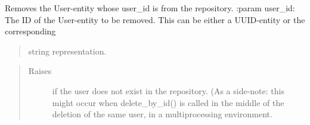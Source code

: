 \documentclass[letterpaper,10pt,english]{sphinxmanual}
\begin{document}
\begin{fulllineitems}
\label{\detokenize{pydash_app.user.repository:pydash_app.user.repository.delete_by_id}}
Removes the User-entity whose user\_id is  from the repository.
:param user\_id: The ID of the User-entity to be removed. This can be either a UUID-entity or the corresponding
\begin{quote}

string representation.
\end{quote}
\begin{quote}\begin{description}
\item[{Raises}] \leavevmode
{} \textendash{} if the user does not exist in the repository.
(As a side-note: this might occur when delete\_by\_id() is called in the middle of the deletion of the same user,
in a multiprocessing environment.

\end{description}\end{quote}

%
\begin{sphinxVerbatim}[commandchars=\\\{\}]
    
  
  
\end{sphinxVerbatim}

\end{fulllineitems}
\end{document}
